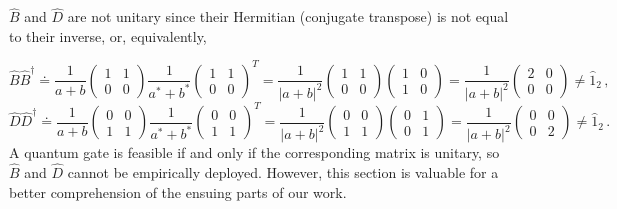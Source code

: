 \documentclass[11pt]{article}
\numberwithin{equation}{section} %
\numberwithin{figure}{section} %
\begin{document}
$\hat{B}$ and $\hat{D}$ are not unitary since their Hermitian (conjugate transpose) is not equal to their inverse, or, equivalently, \cite[p.~36, Eq.~(1.5.2)]{Sakurai}


\begin{equation}
\hat{B}\hat{B}^\dagger\doteq \frac{1}{a+b}\begin{pmatrix} 1 & 1 \\ 0 & 0 \end{pmatrix} \frac{1}{a^*+b^*}\begin{pmatrix} 1 & 1 \\ 0 & 0 \end{pmatrix}^T =  \frac{1}{|a+b|^2}  \begin{pmatrix} 1 & 1 \\ 0 & 0 \end{pmatrix}  \begin{pmatrix} 1 & 0 \\ 1 & 0 \end{pmatrix} = \frac{1}{|a+b|^2}  \begin{pmatrix} 2 & 0 \\ 0 & 0 \end{pmatrix} \neq \hat{1}_2\,\textrm{,}
\end{equation}
\begin{equation}
\hat{D}\hat{D}^\dagger\doteq\frac{1}{a+b}\begin{pmatrix} 0 & 0 \\ 1 & 1 \end{pmatrix} \frac{1}{a^*+b^*}\begin{pmatrix} 0 & 0 \\ 1 & 1 \end{pmatrix}^T =  \frac{1}{|a+b|^2}  \begin{pmatrix} 0 & 0 \\ 1 & 1 \end{pmatrix}  \begin{pmatrix} 0 & 1 \\ 0 & 1 \end{pmatrix} = \frac{1}{|a+b|^2}  \begin{pmatrix} 0 & 0 \\ 0 & 2 \end{pmatrix} \neq \hat{1}_2\,\textrm{.}
\end{equation}
A quantum gate is feasible if and only if the corresponding matrix is unitary, so $\hat{B}$ and $\hat{D}$ cannot be empirically deployed. However, this section is valuable for a better comprehension of the ensuing parts of our work.
\end{document}
